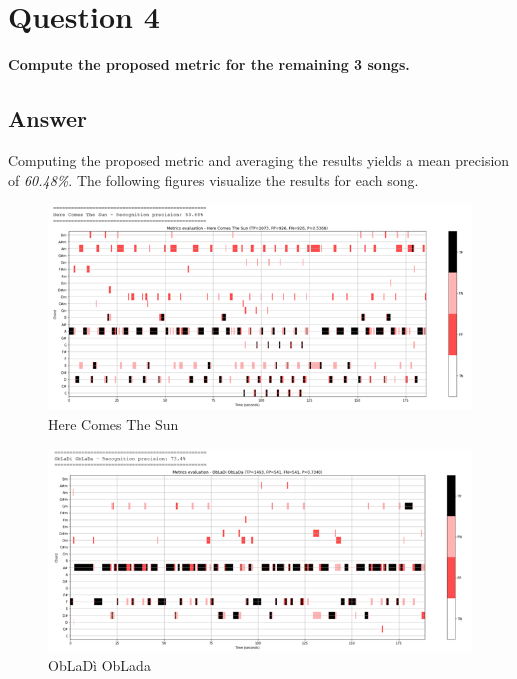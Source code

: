 \documentclass[
	12pt, %
]{fphw}
\begin{document}
{%
\newpage
\section*{\color{red}Question 4}

\begin{problem}
	\textbf{Compute the proposed metric for the remaining 3 songs.}
\end{problem}

\subsection*{\color{blue}Answer}

Computing the proposed metric and averaging the results yields a mean precision of \emph{60.48\%}. The following figures visualize the results for each song.

\begin{figure}[H]
 \centering
 \includegraphics[scale=1]{./images/4_here_comes_the_sun_metrics.png}
 \caption{Here Comes The Sun}
\end{figure}

\begin{figure}[H]
 \centering
 \includegraphics[scale=1]{./images/4_obladi_oblada_metrics.png}
 \caption{ObLaDì ObLada}
\end{figure}

}
\end{document}
